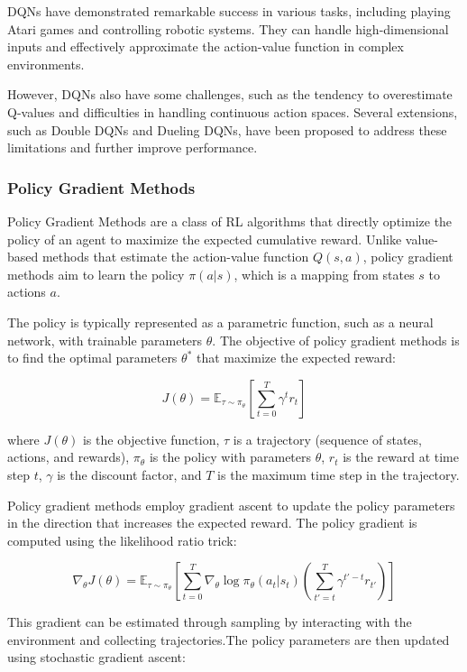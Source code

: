 DQNs have demonstrated remarkable success in various tasks, including playing Atari games and controlling robotic systems. They can handle high-dimensional inputs and effectively approximate the action-value function in complex environments.

However, DQNs also have some challenges, such as the tendency to overestimate Q-values and difficulties in handling continuous action spaces. Several extensions, such as Double DQNs and Dueling DQNs, have been proposed to address these limitations and further improve performance.

\subsubsection{Policy Gradient Methods}
Policy Gradient Methods are a class of RL algorithms that directly optimize the policy of an agent to maximize the expected cumulative reward. Unlike value-based methods that estimate the action-value function \(Q(s, a)\), policy gradient methods aim to learn the policy \(\pi(a|s)\), which is a mapping from states \(s\) to actions \(a\).

The policy is typically represented as a parametric function, such as a neural network, with trainable parameters \(\theta\). The objective of policy gradient methods is to find the optimal parameters \(\theta^*\) that maximize the expected reward:

\[J(\theta) = \mathbb{E}_{\tau \sim \pi_{\theta}} \left[ \sum_{t=0}^{T} \gamma^t r_t \right]\]

where \(J(\theta)\) is the objective function, \(\tau\) is a trajectory (sequence of states, actions, and rewards), \(\pi_{\theta}\) is the policy with parameters \(\theta\), \(r_t\) is the reward at time step \(t\), \(\gamma\) is the discount factor, and \(T\) is the maximum time step in the trajectory.

Policy gradient methods employ gradient ascent to update the policy parameters in the direction that increases the expected reward. The policy gradient is computed using the likelihood ratio trick:

\[\nabla_{\theta} J(\theta) = \mathbb{E}_{\tau \sim \pi_{\theta}} \left[ \sum_{t=0}^{T} \nabla_{\theta} \log \pi_{\theta}(a_t|s_t) \left( \sum_{t'=t}^{T} \gamma^{t'-t} r_{t'} \right) \right]\]

This gradient can be estimated through sampling by interacting with the environment and collecting trajectories.The policy parameters are then updated using stochastic gradient ascent:

